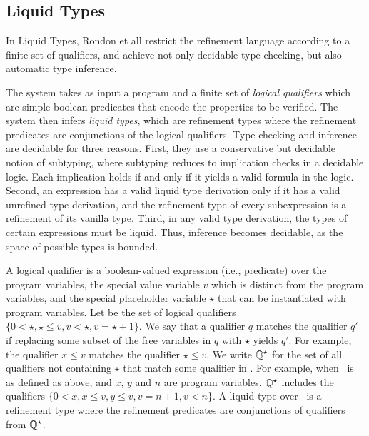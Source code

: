 %

\subsection{Liquid Types}\label{subsec:liquid}

In Liquid Types\cite{LiquidPLDI08}, 
Rondon et all restrict the refinement language according to a 
finite set of qualifiers, and achieve not only decidable type checking, but also automatic
type inference.

The system takes as input a program and 
a finite set of \textit{logical qualifiers}
which are simple boolean predicates 
that encode the properties to be verified. 
The system then infers
\textit{liquid types}, which are refinement types where the refinement predicates are conjunctions of the logical qualifiers.
Type checking and inference are decidable for
three reasons. 
%
First, they use a conservative but decidable
notion of subtyping, where 
subtyping reduces to implication checks in a decidable logic.
Each implication holds if and only if it yields a valid formula in
the logic. 
%
Second, an expression has a valid liquid type derivation
only if it has a valid unrefined type derivation, and the refinement 
type of every subexpression is a refinement of its vanilla type. 
%
Third, in any valid type derivation, the types of certain expressions
must be liquid. Thus, inference becomes decidable, as the space of
possible types is bounded. 


A logical qualifier is a
boolean-valued expression (i.e., predicate) over the program variables, 
the special value variable $v$ which is distinct from the
program variables, and the special placeholder variable $\star$ that
can be instantiated with program variables. 
Let \qset be the set of logical qualifiers
$\{0 < \star, \star \leq v, v < \star,  v = \star + 1\}$. 
%
We say that
a qualifier $q$ matches the qualifier $q'$
if replacing some subset of
the free variables in $q$ with $\star$ yields $q'$.
For example, the qualifier
$x \leq v$ matches the qualifier $\star \leq v$. 
We write $\mathbb{Q}^\star$
for the set of all
qualifiers not containing $\star$ that match some qualifier in \qset. 
For example, when \qset\ is as defined as above, 
and $x$, $y$ and $n$ are program variables.
$\mathbb{Q}^\star$
includes the qualifiers
$\{0 < x, x \leq v, y \leq v, v = n + 1, v <n\}$. 
A liquid type over \qset\ is a refinement type where the refinement predicates are
conjunctions of qualifiers from $\mathbb{Q} ^ \star$.

